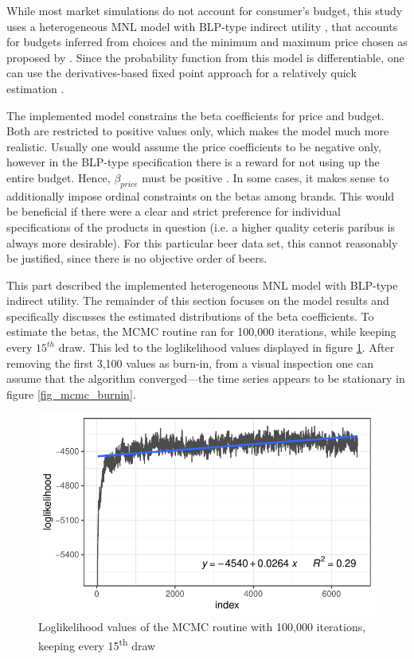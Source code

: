 \documentclass[12pt,a4paper]{article}
\begin{document}
While most market simulations do not account for consumer's budget, this study uses a heterogeneous MNL model with BLP-type indirect utility \citep{berryAutomobilePricesMarket1995}, that accounts for budgets inferred from choices and the minimum and maximum price chosen as proposed by \cite{pachaliPerilsIgnoringBudget2017}.
Since the probability function from this model is differentiable, one can use the derivatives-based fixed point approach for a relatively quick estimation \citep{morrowFixedPointApproachesComputing2011a}.

The implemented model constrains the beta coefficients for price and budget.
Both are restricted to positive values only, which makes the model much more realistic.
Usually one would assume the price coefficients to be negative only, however in the BLP-type specification there is a reward for not using up the entire budget. Hence, $\beta_{price}$ must be positive \citep{pachaliPerilsIgnoringBudget2017}.
In some cases, it makes sense to additionally impose ordinal constraints on the betas among brands.
This would be beneficial if there were a clear and strict preference for individual specifications of the products in question (i.e. a higher quality ceteris paribus is always more desirable).
For this particular beer data set, this cannot reasonably be justified, since there is no objective order of beers.

This part described the implemented heterogeneous MNL model with BLP-type indirect utility.
The remainder of this section focuses on the model results and specifically discusses the estimated distributions of the beta coefficients.
To estimate the betas, the MCMC routine ran for 100,000 iterations, while keeping every $15^{th}$ draw.
This led to the loglikelihood values displayed in figure \ref{fig_mcmc}.
After removing the first 3,100 values as burn-in, from a visual inspection one can assume that the algorithm converged---the time series appears to be stationary in figure \ref{fig_mcmc_burnin}.

\begin{figure}[ht]
	\centering
  \includegraphics[scale = 0.8]{figures/mcmc_before_burnin_fitted.pdf}
	\caption{Loglikelihood values of the MCMC routine with 100,000 iterations, keeping every 15\textsuperscript{th} draw}
	\label{fig_mcmc}
\end{figure}
\end{document}
